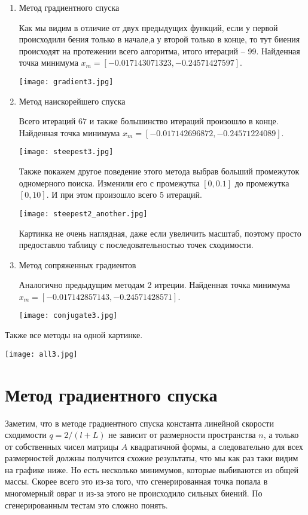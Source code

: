 \begin{enumerate}
    \item Метод градиентного спуска
    
    Как мы видим в отличие от двух предыдущих функций, если у первой происходили бения только в начале,а у
    второй только в конце, то тут биения происходят на протежении всего алгоритма, итого итераций -- 99.
    Найденная точка минимума $x_m = [-0.017143071323, -0.24571427597]$.

    \texttt{[image: gradient3.jpg]}

    \item Метод наискорейшего спуска
    

    Всего итераций $67$ и также большинство итераций произошло в конце.
    Найденная точка минимума $x_m = [-0.017142696872, -0.24571224089]$.
    
    \texttt{[image: steepest3.jpg]}

    Также покажем другое поведение этого метода выбрав больший промежуток одномерного поиска.
    Изменили его с промежутка $[0, 0.1]$ до промежутка $[0, 10]$.
    И при этом произошло всего 5 итераций.

    \texttt{[image: steepest2\_another.jpg]}    

    Картинка не очень наглядная, даже если увеличить масштаб, поэтому просто предоставлю таблицу
    с последовательностью точек сходимости.


    \item Метод сопряженных градиентов
    
    Аналогично предыдущим методам 2 итреции.
    Найденная точка минимума $x_m = [-0.017142857143, -0.24571428571]$.

    \texttt{[image: conjugate3.jpg]}


\end{enumerate}

Также все методы на одной картинке.

\texttt{[image: all3.jpg]}

\newpage
\section{Метод градиентного спуска}

Заметим, что в методе градиентного спуска константа линейной скорости сходимости $q = 2/(l + L)$ не зависит
от размерности пространства $n$, а только от собственных чисел матрицы $A$ квадратичной формы, а следовательно
для всех размерностей должны получится схожие результаты, что мы как раз таки видим на графике ниже.
Но есть несколько минимумов, которые выбиваются из общей массы.
 Скорее всего это из-за того, что сгенерированная
точка попала в многомерный овраг и из-за этого не происходило сильных биений. По сгенерированным
тестам это сложно понять.

